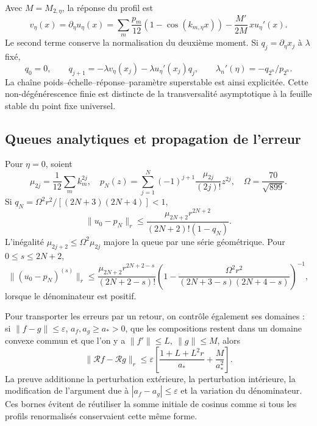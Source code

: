 Avec \(M=M_{2,\eta}\), la réponse du profil est
\[
v_\eta(x)=\partial_\eta u_\eta(x)
=\sum_m\frac{p_m}{12}(1-\cos(k_{m,\eta}x))
-\frac{M'}{2M}\,x u_\eta'(x).
\]
Le second terme conserve la normalisation du deuxième moment. Si \(q_j=\partial_\eta x_j\) à \(\lambda\) fixé,
\[
q_0=0,\qquad q_{j+1}=-\lambda v_\eta(x_j)-\lambda u_\eta'(x_j)q_j,
\qquad
\boxed{\lambda_n'(\eta)=-q_{2^n}/p_{2^n}}.
\]
La chaîne poids–échelle–réponse–paramètre superstable est ainsi explicitée. Cette non-dégénérescence finie est distincte de la transversalité asymptotique à la feuille stable du point fixe universel.


\subsection{Queues analytiques et propagation de l’erreur}
\label{hmtfg:desarrollo:9}

Pour \(\eta=0\), soient
\[
\mu_{2j}=\frac1{12}\sum_mk_m^{2j},\quad
p_N(z)=\sum_{j=1}^N(-1)^{j+1}\frac{\mu_{2j}}{(2j)!}z^{2j},
\quad\Omega=\frac{70}{\sqrt{899}}.
\]
Si \(q_N=\Omega^2r^2/[(2N+3)(2N+4)]<1\),
\[
\|u_0-p_N\|_r\le
\frac{\mu_{2N+2}r^{2N+2}}{(2N+2)!(1-q_N)}.
\]
L’inégalité \(\mu_{2j+2}\le\Omega^2\mu_{2j}\) majore la queue par une série géométrique. Pour \(0\le s\le2N+2\),
\[
\|(u_0-p_N)^{(s)}\|_r\le
\frac{\mu_{2N+2}r^{2N+2-s}}{(2N+2-s)!}
\left(1-\frac{\Omega^2r^2}{(2N+3-s)(2N+4-s)}\right)^{-1},
\]
lorsque le dénominateur est positif.

Pour transporter les erreurs par un retour, on contrôle également ses domaines : si \(\|f-g\|\le\varepsilon\), \(a_f,a_g\ge a_*>0\), que les compositions restent dans un domaine convexe commun et que l’on y a \(\|f'\|\le L,\ \|g\|\le M\), alors
\[
\|\mathcal Rf-\mathcal Rg\|_r
\le\varepsilon\left[\frac{1+L+L^2r}{a_*}+\frac{M}{a_*^2}\right].
\]
La preuve additionne la perturbation extérieure, la perturbation intérieure, la modification de l’argument due à \(|a_f-a_g|\le\varepsilon\) et la variation du dénominateur. Ces bornes évitent de réutiliser la somme initiale de cosinus comme si tous les profils renormalisés conservaient cette même forme.

